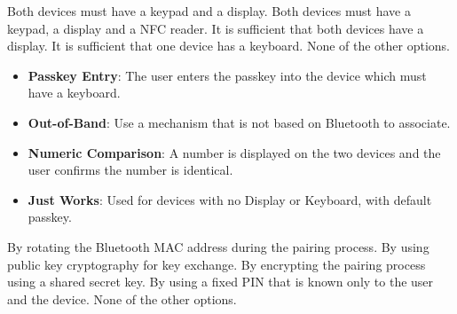 \begin{checkboxes}
    \choice Both devices must have a keypad and a display.
    \choice Both devices must have a keypad, a display and a NFC reader.
    \choice It is sufficient that both devices have a display.
    \choice It is sufficient that one device has a keyboard.
    \CorrectChoice None of the other options.
\end{checkboxes}

\begin{solution}
    \begin{itemize}
        \item \textbf{Passkey Entry}: The user enters the passkey into the device which must have a keyboard.
        \item \textbf{Out-of-Band}: Use a mechanism that is not based on Bluetooth to associate.
        \item \textbf{Numeric Comparison}: A number is displayed on the two devices and the user confirms the number is identical.
        \item \textbf{Just Works}: Used for devices with no Display or Keyboard, with default passkey.
    \end{itemize}
\end{solution}

\begin{checkboxes}
    \choice By rotating the Bluetooth MAC address during the pairing process.
    \choice By using public key cryptography for key exchange.
    \CorrectChoice By encrypting the pairing process using a shared secret key.
    \choice By using a fixed PIN that is known only to the user and the device.
    \choice None of the other options.
\end{checkboxes}